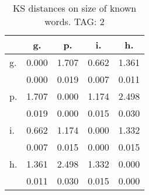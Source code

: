 \begin{table}[h!]
\begin{center}
\begin{tabular}{| l | c | c | c | c |}\hline
 & g. & p. & i. & h. \\\hline
g. & 0.000  & 1.707  & 0.662  & 1.361 \\\hline
 & 0.000  & 0.019  & 0.007  & 0.011 \\\hline
p. & 1.707  & 0.000  & 1.174  & 2.498 \\\hline
 & 0.019  & 0.000  & 0.015  & 0.030 \\\hline
i. & 0.662  & 1.174  & 0.000  & 1.332 \\\hline
 & 0.007  & 0.015  & 0.000  & 0.015 \\\hline
h. & 1.361  & 2.498  & 1.332  & 0.000 \\\hline
 & 0.011  & 0.030  & 0.015  & 0.000 \\\hline
\end{tabular}
\caption{KS distances on size of known words. TAG: 2}
\end{center}
\end{table}